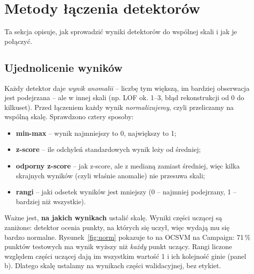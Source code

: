 \documentclass[11pt,a4paper]{article}
\begin{document}
\begin{table}[H]
  \centering\small
  \caption{Detektory bazowe ($k$ -- liczba składowych PCA lub sąsiadów LOF;
  $m$, nn, md -- wymiar, liczba sąsiadów i odstęp UMAP; $z$ -- wymiar
  autoenkodera; $T$ -- liczba drzew; $\nu$, $\gamma$ -- parametry OCSVM).}
  \label{tab:base}
\end{table}

\FloatBarrier
\section{Metody łączenia detektorów}
\label{sec:methods}

Ta sekcja opisuje, jak sprowadzić wyniki detektorów do wspólnej skali i jak
je połączyć.

\FloatBarrier
\subsection{Ujednolicenie wyników}

Każdy detektor daje \emph{wynik anomalii} -- liczbę tym większą, im bardziej
obserwacja jest podejrzana -- ale w innej skali (np. LOF ok. 1--3, błąd
rekonstrukcji od 0 do kilkuset). Przed łączeniem każdy wynik
\emph{normalizujemy}, czyli przeliczamy na wspólną skalę. Sprawdzono cztery
sposoby:
\begin{itemize}
  \item \textbf{min-max} -- wynik najmniejszy to 0, największy to 1;
  \item \textbf{z-score} -- ile odchyleń standardowych wynik leży od średniej;
  \item \textbf{odporny z-score} -- jak z-score, ale z medianą zamiast
  średniej, więc kilka skrajnych wyników (czyli właśnie anomalie) nie
  przesuwa skali;
  \item \textbf{rangi} -- jaki odsetek wyników jest mniejszy (0 -- najmniej
  podejrzany, 1 -- bardziej niż wszystkie).
\end{itemize}

Ważne jest, \textbf{na jakich wynikach} ustalić skalę. Wyniki części uczącej
są zaniżone: detektor ocenia punkty, na których się uczył, więc wydają mu
się bardzo normalne. Rysunek~\ref{fig:norm} pokazuje to na OCSVM na Campaign:
71\,\% punktów testowych ma wynik wyższy niż \emph{każdy} punkt uczący.
Rangi liczone względem części uczącej dają im wszystkim wartość 1 i ich
kolejność ginie (panel b). Dlatego skalę ustalamy na wynikach części
walidacyjnej, bez etykiet.
\end{document}
